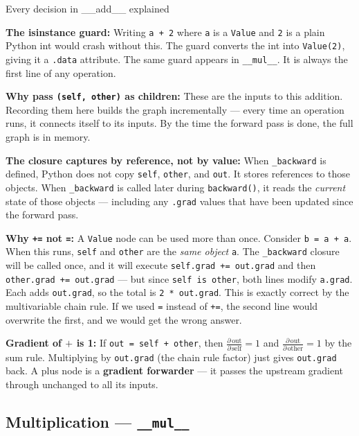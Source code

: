 \documentclass[12pt,a4paper]{article}
\newcommand{\code}[1]{\texttt{\small\color{deepblue}#1}}
\begin{document}
\begin{codeexplainbox}{Every decision in \_\_add\_\_ explained}

\textbf{The isinstance guard:} Writing \code{a + 2} where \code{a} is a \code{Value} and \code{2} is a plain Python int would crash without this. The guard converts the int into \code{Value(2)}, giving it a \code{.data} attribute. The same guard appears in \code{\_\_mul\_\_}. It is always the first line of any operation.

\textbf{Why pass \code{(self, other)} as children:} These are the inputs to this addition. Recording them here builds the graph incrementally — every time an operation runs, it connects itself to its inputs. By the time the forward pass is done, the full graph is in memory.

\textbf{The closure captures by reference, not by value:} When \code{\_backward} is defined, Python does not copy \code{self}, \code{other}, and \code{out}. It stores references to those objects. When \code{\_backward} is called later during \code{backward()}, it reads the \emph{current} state of those objects — including any \code{.grad} values that have been updated since the forward pass.

\textbf{Why \code{+=} not \code{=}:} A \code{Value} node can be used more than once. Consider \code{b = a + a}. When this runs, \code{self} and \code{other} are the \emph{same object} \code{a}. The \code{\_backward} closure will be called once, and it will execute \code{self.grad += out.grad} and then \code{other.grad += out.grad} — but since \code{self is other}, both lines modify \code{a.grad}. Each adds \code{out.grad}, so the total is \code{2 * out.grad}. This is exactly correct by the multivariable chain rule. If we used \code{=} instead of \code{+=}, the second line would overwrite the first, and we would get the wrong answer.

\textbf{Gradient of $+$ is 1:} If \code{out = self + other}, then $\frac{\partial\,\text{out}}{\partial\,\text{self}} = 1$ and $\frac{\partial\,\text{out}}{\partial\,\text{other}} = 1$ by the sum rule. Multiplying by \code{out.grad} (the chain rule factor) just gives \code{out.grad} back. A plus node is a \textbf{gradient forwarder} — it passes the upstream gradient through unchanged to all its inputs.
\end{codeexplainbox}

\subsection{Multiplication — \texttt{\_\_mul\_\_}}
\end{document}
